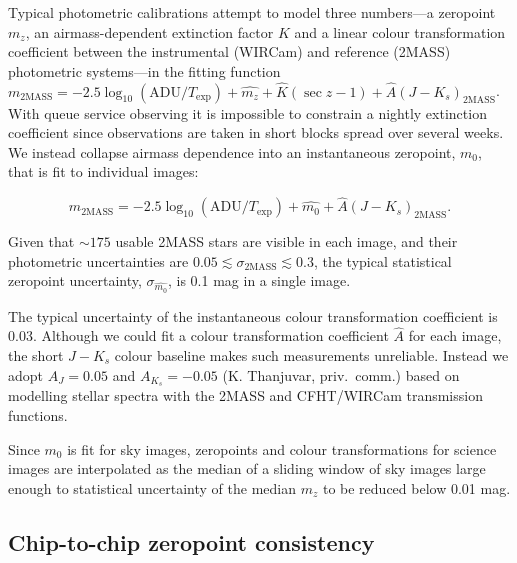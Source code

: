 \documentclass[iop]{emulateapj}
\begin{document}
Typical photometric calibrations attempt to model three numbers---a zeropoint $m_z$, an airmass-dependent extinction factor $K$ and a linear colour transformation coefficient between the instrumental (WIRCam) and reference (2MASS) photometric systems---in the fitting function $m_\mathrm{2MASS} = -2.5 \log_{10}(\mathrm{ADU}/T_\mathrm{exp}) + \hat{m_z} + \hat{K} (\sec z -1) + \hat{A} (J-K_s)_\mathrm{2MASS}$.
With queue service observing it is impossible to constrain a nightly extinction coefficient since observations are taken in short blocks spread over several weeks.
We instead collapse airmass dependence into an instantaneous zeropoint, $m_0$, that is fit to individual images:

\begin{equation}
  \label{eq:photcal}
  m_\mathrm{2MASS} = -2.5 \log_{10}(\mathrm{ADU}/T_\mathrm{exp}) + \hat{m_0} + \hat{A} (J-K_s)_\mathrm{2MASS}.
\end{equation}

Given that $\sim 175$ usable 2MASS stars are visible in each image, and their photometric uncertainties are $0.05 \lesssim \sigma_{\mathrm{2MASS}} \lesssim 0.3$, the typical statistical zeropoint uncertainty, $\sigma_{\hat{m_0}}$, is 0.1 mag in a single image.

The typical uncertainty of the instantaneous colour transformation coefficient is 0.03.
Although we could fit a colour transformation coefficient $\hat{A}$ for each image, the short $J-K_s$ colour baseline makes such measurements unreliable. Instead we adopt $A_J = 0.05$ and $A_{K_s} = -0.05$ (K. Thanjuvar, priv.\ comm.) based on modelling stellar spectra with the 2MASS and CFHT/WIRCam transmission functions.

Since $m_0$ is fit for sky images, zeropoints and colour transformations for science images are interpolated as the median of a sliding window of sky images large enough to statistical uncertainty of the median $m_z$ to be reduced below 0.01 mag.

\subsection{Chip-to-chip zeropoint consistency}
\label{sec:chip_zp}
\end{document}
